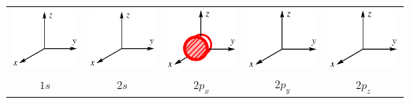 \begin{center}
\begin{tabular}{ccccc}
\includegraphics[scale=0.6]{figure/repere_orbitale.eps} & \includegraphics[scale=0.6]{figure/repere_orbitale.eps} & \includegraphics[scale=0.6]{figure/orbitale.eps} & \includegraphics[scale=0.6]{figure/repere_orbitale.eps} & \includegraphics[scale=0.6]{figure/repere_orbitale.eps} \\
$1s$ & $2s$ & $2p_x$ & $2p_y$ & $2p_z$
\end{tabular}
\end{center}
